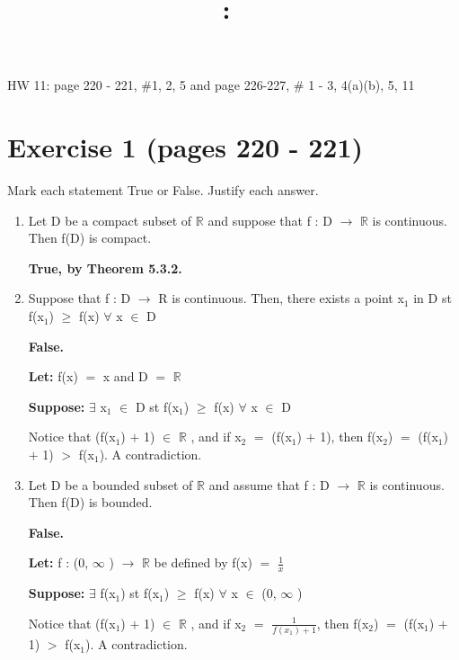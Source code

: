 \documentclass{article}
\title{
    \vspace{2in}
    \textmd{\textbf{\hmwkClass:\ \hmwkTitle}}\\
    \normalsize\vspace{0.1in}\small\vspace{0.1in}\large{\textit{\hmwkClassInstructor}}
    \vspace{3in}
}
\author{\hmwkAuthorName}
\date{}
\newcommand{\mt}[1]{\ensuremath{#1}}
\newcommand\bsc[2][\DefaultOpt]{%
  \def\DefaultOpt{#2}%
  \section[#1]{#2}%
}
\newcommand{\balist}{\begin{enumerate}[label=\alph*.]}
\newcommand{\elist}{\end{enumerate}}
\newcommand{\lt}[1]{\textbf{Let: } #1}
\newcommand{\supp}[1]{\textbf{Suppose: } #1}
\newcommand{\br}{\mt{\mathbb{R}} }       %
\newcommand{\fa}{\mt{\forall} }          %
\newcommand{\mem}{\mt{\in} }
\newcommand{\exs}{\mt{\exists} }
\newcommand{\lra}{ \mt{\longrightarrow} } %
\newcommand{\ps}{\mt{+} }
\newcommand{\gr}{\mt{>} }
\newcommand{\gre}{\mt{\geq} }
\newcommand{\eql}{\mt{=} }
\newcommand{\uw}[2]{#1\mt{_{#2}}}
\newcommand{\frc}[2]{\mt{\frac{#1}{#2}}}
\newcommand{\infy}{\mt{\infty} }
\begin{document}
HW 11: page 220 - 221, \#1, 2, 5 and page 226-227, \# 1 - 3, 4(a)(b), 5, 11

\bsc{Exercise 1 (pages 220 - 221)}{

Mark each statement True or False. Justify each answer.
\balist
\item Let D be a compact subset of \br and suppose that f : D \lra \br is continuous. Then f(D) is compact.
	
	\textbf{True, by Theorem 5.3.2.}
\item Suppose that f : D \lra R is continuous. Then, there exists a point \uw{x}{1} in D st f(\uw{x}{1}) \gre f(x) \fa x \mem D
	
	\textbf{False.}
	
	\lt{f(x) \eql x and D \eql \br}
	
	\supp{\exs \uw{x}{1} \mem D st f(\uw{x}{1}) \gre f(x) \fa x \mem D}
	
	Notice that (f(\uw{x}{1}) \ps 1) \mem \br, and if \uw{x}{2} \eql (f(\uw{x}{1}) \ps 1), then f(\uw{x}{2}) \eql (f(\uw{x}{1}) \ps 1) \gr f(\uw{x}{1}). A contradiction.
\item Let D be a bounded subset of \br and assume that f : D \lra \br is continuous. Then f(D) is bounded.

	\textbf{False.}
	
	\lt{f : (0, \infy) \lra \br be defined by f(x) \eql \frc{1}{x}}
	
	\supp{\exs f(\uw{x}{1}) st f(\uw{x}{1}) \gre f(x) \fa x \mem (0, \infy)}
	
	Notice that (f(\uw{x}{1}) \ps 1) \mem \br, and if \uw{x}{2} \eql \frc{1}{f(\uw{x}{1}) \ps 1}, then f(\uw{x}{2}) \eql (f(\uw{x}{1}) \ps 1) \gr f(\uw{x}{1}). A contradiction.
\elist
}
\end{document}

